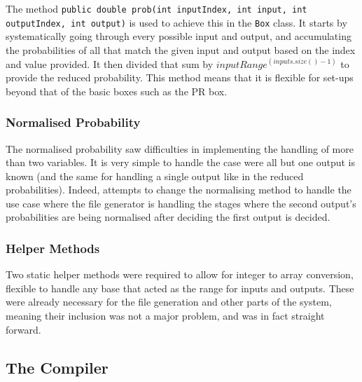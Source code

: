 \documentclass[report.tex]{subfiles}
\begin{document}
The method \texttt{public double prob(int inputIndex, int input,
int outputIndex, int output)} is used to achieve this in the \texttt{Box} class.
It starts by systematically going through every possible input and output, and
accumulating the probabilities of all that match the given input and output
based on the index and value provided. It then divided that sum by
\(inputRange ^ (inputs.size() - 1)\) to provide the reduced probability. This
method means that it is flexible for set-ups beyond that of the basic boxes such
as the PR box.

\subsubsection{Normalised Probability} %
\label{ssub:normalised_probability}
The normalised probability saw difficulties in implementing the handling of more
than two variables. It is very simple to handle the case were all but one output
is known (and the same for handling a single output like in the reduced
probabilities). Indeed, attempts to change the normalising method to handle the
use case where the file generator is handling the stages where the second
output's probabilities are being normalised after deciding the first output is
decided.

 


\subsubsection{Helper Methods} %
\label{ssub:helper_methods}
Two static helper methods were required to allow for integer to array
conversion, flexible to handle any base that acted as the range for inputs and
outputs. These were already necessary for the file generation and other parts
of the system, meaning their inclusion was not a major problem, and was in fact
straight forward.

\subsection{The Compiler} %
\label{sub:the_compiler}

\newpage
\end{document}
